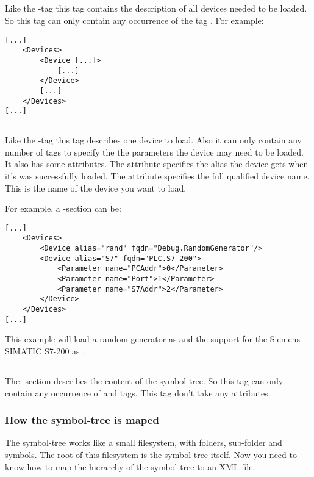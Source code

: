 \subsection{}
Like the -tag this tag contains the description of
all devices needed to be loaded. So this tag can only contain any
occurrence of the tag . For example:
\begin{verbatim}
[...]
    <Devices>
        <Device [...]>
            [...]
        </Device>
        [...]
    </Devices>
[...]
\end{verbatim}


\subsection{}
Like the -tag this tag describes one device to load. Also it can only contain 
any number of  tags to specify the the parameters the device may need to be
loaded. It also has some attributes. The attribute  specifies the alias the device 
gets when it's was successfully loaded. The attribute  specifies the full qualified 
device name. This is the name of the device you want to load.

For example, a -section can be:
\begin{verbatim}
[...]
    <Devices>
        <Device alias="rand" fqdn="Debug.RandomGenerator"/>
        <Device alias="S7" fqdn="PLC.S7-200">
            <Parameter name="PCAddr">0</Parameter>
            <Parameter name="Port">1</Parameter>
            <Parameter name="S7Addr">2</Parameter>
        </Device>
    </Devices>
[...]
\end{verbatim}
This example will load a random-generator as   and the support for the Siemens SIMATIC S7-200 
as .


\subsection{}
The -section describes the content of the symbol-tree. So this tag can only contain
any occurrence of  and  tags. This tag don't take any attributes.

\subsubsection{How the symbol-tree is maped}
The symbol-tree works like a small filesystem, with folders, sub-folder and symbols. The root of this filesystem is the
symbol-tree itself. Now you need to know how to map the hierarchy of the symbol-tree to an XML file.

